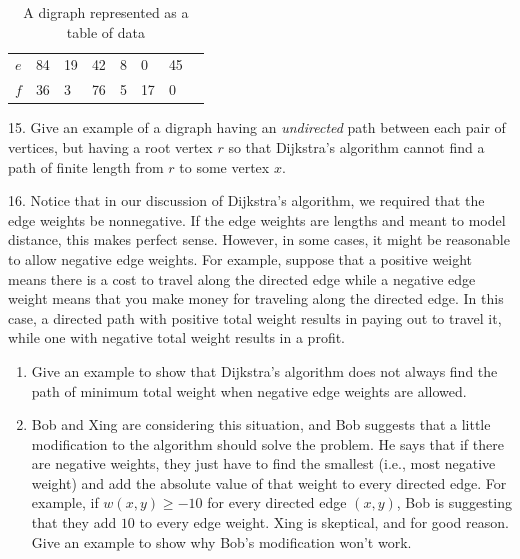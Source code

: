 \documentclass[10pt,]{book}
\theoremstyle{plain}
\theoremstyle{definition}
\theoremstyle{definition}
\theoremstyle{definition}
\theoremstyle{definition}
\numberwithin{equation}{section}
\begin{document}
\begin{exerciselist}
\begin{table}
\begin{tabular}{lAllllll}
\(e\)&84&19&42&8&0&45\tabularnewline[0pt]
\(f\)&36&3&76&5&17&0
\end{tabular}
\caption{A digraph represented as a table of data\label{tab_digraph2}}
\end{table}
\par\smallskip
\item[15.]\hypertarget{exercise-27}{}\hypertarget{p-260}{}%
Give an example of a digraph having an \emph{undirected} path between each pair of vertices, but having a root vertex \(r\) so that Dijkstra's algorithm cannot find a path of finite length from \(r\) to some vertex \(x\).%
\par\smallskip
\item[16.]\hypertarget{exercise-28}{}\hypertarget{p-261}{}%
Notice that in our discussion of Dijkstra's algorithm, we required that the edge weights be nonnegative. If the edge weights are lengths and meant to model distance, this makes perfect sense. However, in some cases, it might be reasonable to allow negative edge weights. For example, suppose that a positive weight means there is a cost to travel along the directed edge while a negative edge weight means that you make money for traveling along the directed edge. In this case, a directed path with positive total weight results in paying out to travel it, while one with negative total weight results in a profit. \leavevmode%
\begin{enumerate}[label=(\alph*)]
\item\hypertarget{li-51}{}\hypertarget{p-262}{}%
Give an example to show that Dijkstra's algorithm does not always find the path of minimum total weight when negative edge weights are allowed.%
\item\hypertarget{li-52}{}\hypertarget{p-263}{}%
Bob and Xing are considering this situation, and Bob suggests that a little modification to the algorithm should solve the problem. He says that if there are negative weights, they just have to find the smallest (i.e.\@, most negative weight) and add the absolute value of that weight to every directed edge. For example, if \(w(x,y)\geq -10\) for every directed edge \((x,y)\), Bob is suggesting that they add \(10\) to every edge weight. Xing is skeptical, and for good reason. Give an example to show why Bob's modification won't work.%
\end{enumerate}
%
\par\smallskip
\end{exerciselist}
\end{document}
